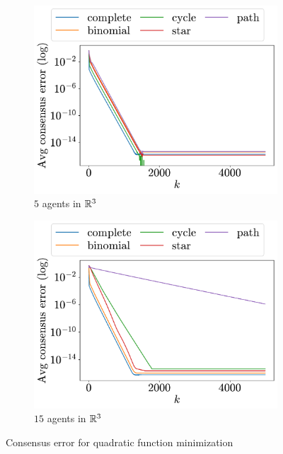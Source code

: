 \documentclass[a4paper,11pt,oneside]{book}
\begin{document}
\begin{figure}[H]
      \centering
      \begin{subfigure}[t]{0.48\linewidth}
            \centering
            \includegraphics[width=\linewidth]{./figs/quadratic/5_3/consensus.pdf} 
            \caption{$5$ agents in ${\mathbb{R}}^{3}$}
      \end{subfigure}
      \hfill
      \begin{subfigure}[t]{0.48\linewidth}
            \centering
            \includegraphics[width=\linewidth]{./figs/quadratic/15_3/consensus.pdf} 
            \caption{$15$ agents in ${\mathbb{R}}^{3}$}
      \end{subfigure}
      \caption{Consensus error for quadratic function minimization}
      \label{fig:quadratic_consensus}
\end{figure}
\end{document}
